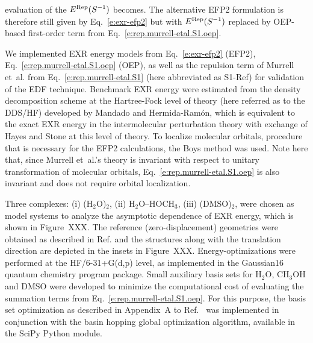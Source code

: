 evaluation of the $E^{\rm Rep}(S^{-1})$ becomes. 
The alternative EFP2 formulation %
is therefore still given by Eq.~\eqref{e:exr-efp2}
%
%
but with $E^{\rm Rep}(S^{-1})$ replaced by OEP\hyp{}based
first\hyp{}order term from Eq.~\eqref{e:rep.murrell-etal.S1.oep}.

We implemented EXR energy models from Eq.~\eqref{e:exr-efp2}
(EFP2), Eq.~\eqref{e:rep.murrell-etal.S1.oep} (OEP), as well as the repulsion term of Murrell et~al.
from Eq.~\eqref{e:rep.murrell-etal.S1} (here abbreviated as S1-Ref) for validation of the EDF technique.
Benchmark EXR energy were estimated from the density decomposition scheme 
at the Hartree\hyp{}Fock level of theory (here referred as to the DDS/HF) 
developed by Mandado and Hermida\hyp{}Ram{\'o}n,\cite{Mandado.Hermida-Ramon.JCTC.2011} 
which is equivalent to the exact EXR energy 
in the intermolecular perturbation theory with exchange of Hayes and Stone
at this level of theory.\cite{Hayes.Stone.MolPhys.1984} 
To localize molecular orbitals, procedure that is necessary for the EFP2 calculations,
the Boys method\cite{Boys.RevModPhys.1960} was used. Note here that, since
Murrell et~al.'s theory is invariant with respect to unitary transformation
of molecular orbitals, Eq.~\eqref{e:rep.murrell-etal.S1.oep} is also invariant and does not require
orbital localization. 
%
%

Three complexes: 
(i) (H$_2$O)$_2$, 
(ii) H$_2$O--HOCH$_3$, 
(iii) (DMSO)$_2$,
were chosen as model systems to analyze the asymptotic dependence 
of EXR energy, which is shown in Figure~XXX. 
The reference (zero\hyp{}displacement) geometries
were obtained as described in Ref.\cite{Blasiak.Bednarska.Choluj.Bartkowiak.JCP.2019} 
and the structures  
along with the translation direction are depicted
in the insets in Figure~XXX.
Energy\hyp{}optimizations were performed at the HF/6-31+G(d,p) level,
as implemented in 
the {\sc Gaussian16} quantum chemistry program package.\cite{Gaussian16}
Small auxiliary basis sets for H$_2$O, CH$_3$OH and DMSO were developed
to minimize the computational cost of evaluating the summation terms
from Eq.~\eqref{e:rep.murrell-etal.S1.oep}. For this purpose, the basis set optimization 
as described in Appendix~A to Ref.~\cite{Blasiak.Bednarska.Choluj.Bartkowiak.JCP.2019} was implemented
in conjunction with the basin hopping global optimization algorithm,  %
available in the SciPy Python module. %

